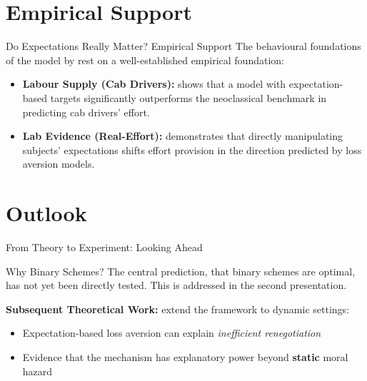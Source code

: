\documentclass{beamer}
\begin{document}
\section{Empirical Support}
\begin{frame}{Do Expectations Really Matter? Empirical Support}
    The behavioural foundations of the model by \textcite{Herweg2010} rest on a well-established empirical foundation:
    \vspace{0.2cm}
    \begin{itemize}
    \setlength{\itemsep}{8pt}
        \item \textbf{Labour Supply (Cab Drivers):} \textcite{Crawford2011} shows that a model
              with expectation-based targets significantly outperforms the neoclassical benchmark in predicting cab drivers' effort.
        \item \textbf{Lab Evidence (Real-Effort):} \textcite{Abeler2011} demonstrates that directly manipulating subjects' expectations shifts effort provision in the direction predicted by loss aversion models.
    \end{itemize}
    
    \medskip
    
\end{frame}

\section{Outlook}
\begin{frame}{From Theory to Experiment: Looking Ahead}

    \begin{alertblock}{Why Binary Schemes?}
        The central prediction, that binary schemes are optimal, has not yet been directly tested. This is addressed in the second presentation.
    \end{alertblock}

    \bigskip
     
    \textbf{Subsequent Theoretical Work:} \textcite{Herweg2015} extend the framework to dynamic settings:
    \begin{itemize}
        \item Expectation-based loss aversion can explain \emph{inefficient renegotiation}
        \item Evidence that the mechanism has explanatory power beyond \textbf{static} moral hazard
    \end{itemize}
    
\end{frame}
\end{document}
